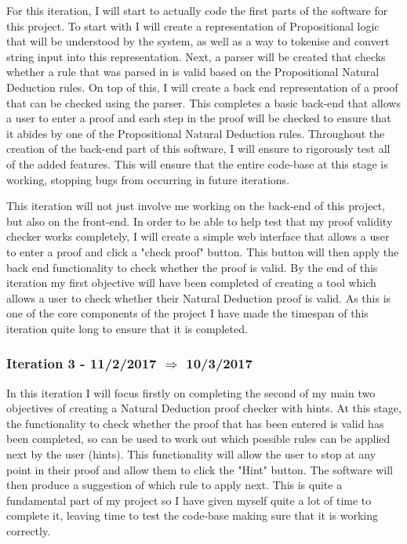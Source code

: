 For this iteration, I will start to actually code the first parts of the software for this project. To start with I will create a representation of Propositional logic that will be understood by the system, as well as a way to tokenise and convert string input into this representation. Next, a parser will be created that checks whether a rule that was parsed in is valid based on the Propositional Natural Deduction rules. On top of this, I will create a back end representation of a proof that can be checked using the parser. This completes a basic back-end that allows a user to enter a proof and each step in the proof will be checked to ensure that it abides by one of the Propositional Natural Deduction rules. Throughout the creation of the back-end part of this software, I will ensure to rigorously test all of the added features. This will ensure that the entire code-base at this stage is working, stopping bugs from occurring in future iterations. 

This iteration will not just involve me working on the back-end of this project, but also on the front-end. In order to be able to help test that my proof validity checker works completely, I will create a simple web interface that allows a user to enter a proof and click a "check proof" button. This button will then apply the back end functionality to check whether the proof is valid. By the end of this iteration my first objective will have been completed of creating a tool which allows a user to check whether their Natural Deduction proof is valid. As this is one of the core components of the project I have made the timespan of this iteration quite long to ensure that it is completed.

\subsubsection{Iteration 3 - 11/2/2017 $\Rightarrow$ 10/3/2017}

In this iteration I will focus firstly on completing the second of my main two objectives of creating a Natural Deduction proof checker with hints. At this stage, the functionality to check whether the proof that has been entered is valid has been completed, so can be used to work out which possible rules can be applied next by the user (hints). This functionality will allow the user to stop at any point in their proof and allow them to click the "Hint" button. The software will then produce a suggestion of which rule to apply next. This is quite a fundamental part of my project so I have given myself quite a lot of time to complete it, leaving time to test the code-base making sure that it is working correctly.

